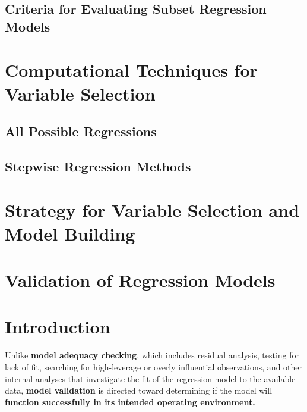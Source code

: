 \documentclass[12pt]{article}
\begin{document}
\subsection{Criteria for Evaluating Subset Regression Models}


\section{Computational Techniques for Variable Selection}

\subsection{All Possible Regressions}

\subsection{Stepwise Regression Methods}


\section{Strategy for Variable Selection and Model Building}




\pagebreak
\section*{Validation of Regression Models}
\setcounter{section}{0}
\bigskip

\section{Introduction}

Unlike \textbf{model adequacy checking}, which includes residual analysis, testing for lack of fit, searching for high-leverage or overly influential observations, and other internal analyses that investigate the fit of the regression model to the available data, \textbf{model validation} is directed toward determining if the model will \textbf{function successfully in its intended operating environment.}
\end{document}

